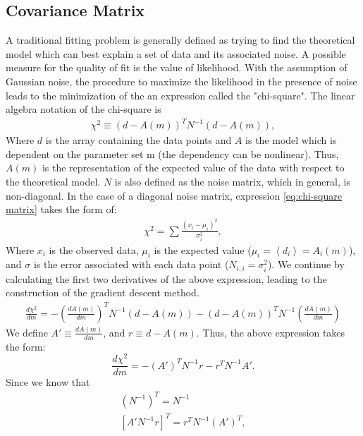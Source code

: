 \documentclass[12pt, TexShade, letterpaper]{report}
\begin{document}
\subsection{Covariance Matrix}
\label{chap:method,sub:cov_mat}
A traditional fitting problem is generally defined as trying to find the theoretical model which can best explain a set of data and its associated noise. A possible measure for the quality of fit is the value of likelihood. With the assumption of Gaussian noise, the procedure to maximize the likelihood in the presence of noise leads to the minimization of the 
an expression called the "chi-square". The linear algebra notation of the chi-square is
\begin{gather}
    \chi^2 \equiv \left (d-A\left(m\right)\right)^T N^{-1} \left(d-A\left(m\right)\right),
    \label{eq:chi-square matrix}
\end{gather}
Where $d$ is the array containing the data points and $A$ is the model which is dependent on the parameter set m (the dependency can be nonlinear). Thus, $A(m)$ is the representation of the expected value of the data with respect to the theoretical model. $N$ is also defined as the noise matrix, which in general, is non-diagonal. In the case of a diagonal noise matrix, expression \ref{eq:chi-square matrix} takes the form of:
\begin{gather}
    \chi^2 = \sum \frac {\left(x_i - \mu_i\right)^2}{\sigma^2_{i}},
    \label{eq: chi-sqaure simple}
\end{gather}
Where $x_i$ is the observed data, $\mu_i$ is the expected value ($\mu_i=\left<d_i\right>=A_i\left(m\right)$), and $\sigma$ is the error associated with each data point ($N_{i, i} = \sigma^2_{i}$). We continue by calculating the first two derivatives of the above expression, leading to the construction of the gradient descent method.
\begin{gather}
        \frac{d \chi^2}{dm} = - \left(\frac{dA\left(m\right)}{dm}\right)^T N^{-1} (d-A(m)) - \left(d-A\left(m\right)\right)^T N^{-1} \left(\frac{dA(m)}{dm}\right ) 
\end{gather}
We define $A' \equiv\frac{dA(m)}{dm}$, and $r \equiv d - A(m)$. Thus, the above expression takes the form:
\begin{equation}
    \frac{d \chi^2}{dm} = - \left(A'\right)^T N^{-1} r - r^T N^{-1} A'.
    \label{eq:csq_first_deriv}
\end{equation}
Since we know that 
\begin{gather}
    \left(N^{-1}\right)^T = N^{-1}\\
    \left[A' N^{-1} r\right]^T = r^T N^{-1} \left(A'\right)^T,
\end{gather}
\end{document}
